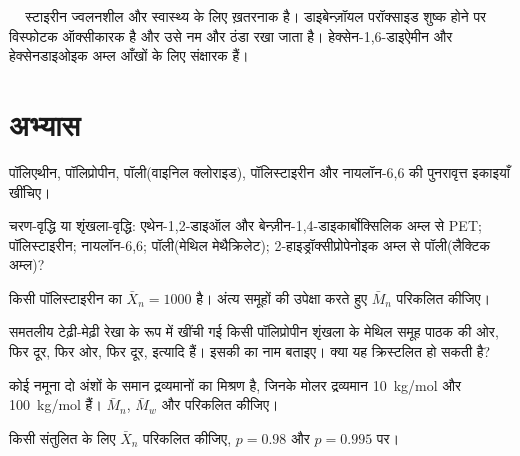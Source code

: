 \begin{safety}{\,\,\,\,\,}
स्टाइरीन ज्वलनशील और स्वास्थ्य के लिए ख़तरनाक है। डाइबेन्ज़ॉयल परॉक्साइड शुष्क होने पर विस्फोटक ऑक्सीकारक है और उसे
नम और ठंडा रखा जाता है। हेक्सेन-1,6-डाइऐमीन और हेक्सेनडाइओइक अम्ल आँखों के लिए संक्षारक हैं।
\end{safety}

\section{अभ्यास}

\begin{exercise}[$\star$]\label{exo:b2:polymer-synthesis:1}
पॉलिएथीन, पॉलिप्रोपीन, पॉली(वाइनिल क्लोराइड), पॉलिस्टाइरीन और नायलॉन-6,6 की पुनरावृत्त इकाइयाँ खींचिए।
\end{exercise}

\begin{exercise}[$\star$]\label{exo:b2:polymer-synthesis:2}
चरण-वृद्धि या शृंखला-वृद्धि: एथेन-1,2-डाइऑल और बेन्ज़ीन-1,4-डाइकार्बोक्सिलिक अम्ल से PET; पॉलिस्टाइरीन;
नायलॉन-6,6; पॉली(मेथिल मेथैक्रिलेट); 2-हाइड्रॉक्सीप्रोपेनोइक अम्ल से पॉली(लैक्टिक अम्ल)?
\end{exercise}

\begin{exercise}[$\star$]\label{exo:b2:polymer-synthesis:3}
किसी पॉलिस्टाइरीन का $\bar X_n = 1000$ है। अंत्य समूहों की उपेक्षा करते हुए $\bar M_n$ परिकलित कीजिए।
\end{exercise}

\begin{exercise}[$\star$]\label{exo:b2:polymer-synthesis:4}
समतलीय टेढ़ी-मेढ़ी रेखा के रूप में खींची गई किसी पॉलिप्रोपीन शृंखला के मेथिल समूह पाठक की ओर, फिर
दूर, फिर ओर, फिर दूर, इत्यादि हैं। इसकी  का नाम बताइए। क्या यह क्रिस्टलित हो सकती है?
\end{exercise}

\begin{exercise}[$\star\star$]\label{exo:b2:polymer-synthesis:5}
कोई नमूना दो अंशों के समान द्रव्यमानों का मिश्रण है, जिनके मोलर द्रव्यमान \qty{10}{kg/mol} और
\qty{100}{kg/mol} हैं। $\bar M_n$, $\bar M_w$ और  परिकलित कीजिए।
\end{exercise}

\begin{exercise}[$\star\star$]\label{exo:b2:polymer-synthesis:6}
किसी संतुलित  के लिए $\bar X_n$ परिकलित कीजिए, $p = 0.98$ और $p = 0.995$ पर।
\end{exercise}

